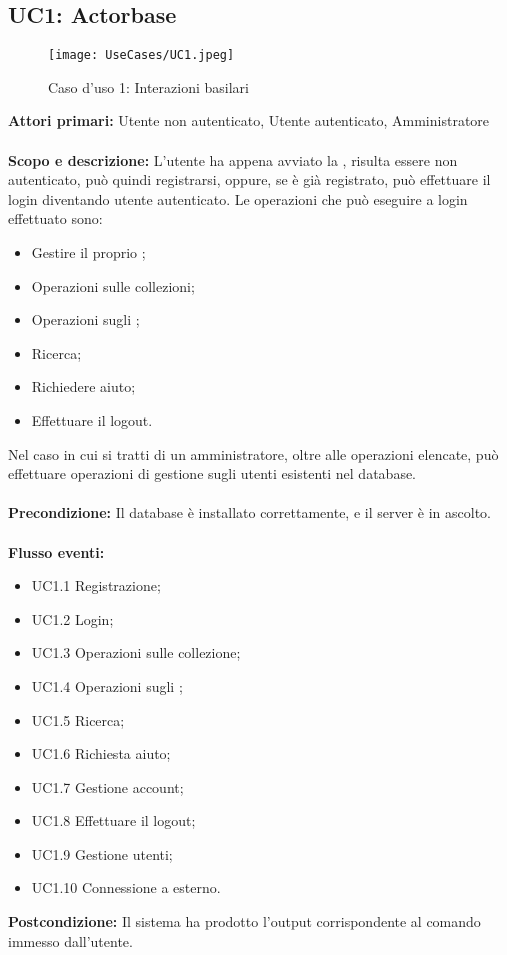 \documentclass{scalatekids-article}
\begin{document}
\subsection{UC1: Actorbase}
\begin{figure}[H]
  \begin{center}
    \texttt{[image: UseCases/UC1.jpeg]}
    \caption{Caso d'uso 1: Interazioni basilari}
  \end{center}
\end{figure}
\textbf{Attori primari:} Utente non autenticato, Utente autenticato, Amministratore\\ \\
\textbf{Scopo e descrizione:}
L’utente ha appena avviato la , risulta essere non autenticato, può quindi
registrarsi, oppure, se è già registrato, può effettuare il login diventando utente
autenticato. Le operazioni che può eseguire a login effettuato sono:
\begin{itemize}
\item Gestire il proprio ;
\item Operazioni sulle collezioni;
\item Operazioni sugli ;
\item Ricerca;
\item Richiedere aiuto;
\item Effettuare il logout.
\end{itemize}
Nel caso in cui si tratti di un amministratore, oltre alle operazioni elencate, può effettuare operazioni di gestione sugli utenti
esistenti nel database.\\ \\
\textbf{Precondizione:} Il database è installato correttamente, e il server è in ascolto.\\ \\
\textbf{Flusso eventi:}
\begin{itemize}
\item UC1.1 Registrazione;
\item UC1.2 Login;
\item UC1.3 Operazioni sulle collezione;
\item UC1.4 Operazioni sugli ;
\item UC1.5 Ricerca;
\item UC1.6 Richiesta aiuto;
\item UC1.7 Gestione account;
\item UC1.8 Effettuare il logout;
\item UC1.9 Gestione utenti;
\item UC1.10 Connessione a  esterno.
\end{itemize}
\textbf{Postcondizione:} Il sistema ha prodotto l'output corrispondente al comando immesso dall'utente.
\end{document}

